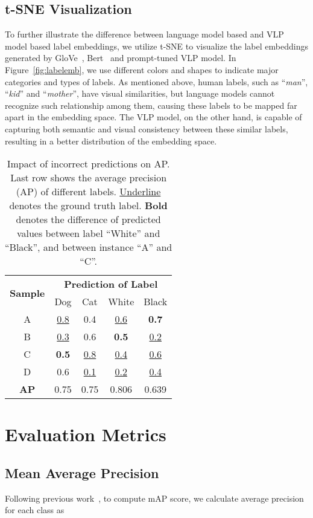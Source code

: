 \documentclass[letterpaper]{article} \usepackage{aaai23}  \usepackage{times}  \usepackage{helvet}  \usepackage{courier}  \usepackage[hyphens]{url}  \usepackage{graphicx} \urlstyle{rm} \def\UrlFont{\rm}  \usepackage{natbib}  \usepackage{caption} \frenchspacing  \setlength{\pdfpagewidth}{8.5in}  \setlength{\pdfpageheight}{11in}
\begin{document}
\subsection{t-SNE Visualization}
To further illustrate the difference between language model based and VLP model based label embeddings, we utilize t-SNE to visualize the label embeddings generated by GloVe~\cite{glove}, Bert~\cite{devlin2018bert} and prompt-tuned VLP model.
In Figure~\ref{fig:labelemb}, we use different colors and shapes to indicate major categories and types of labels.
As mentioned above, human labels, such as ``\textit{man}'', ``\textit{kid}'' and ``\textit{mother}'', have visual similarities, but language models cannot recognize such relationship among them, causing these labels to be mapped far apart in the embedding space.
The VLP model, on the other hand, is capable of capturing both semantic and visual consistency between these similar labels, resulting in a better distribution of the embedding space.

\begin{table}[t]
\footnotesize
\caption{
Impact of incorrect predictions on AP. 
Last row shows the average precision (AP) of different labels. \underline{Underline} denotes the ground truth label.  \textbf{Bold} denotes the difference of predicted values between label ``White'' and ``Black'', and between instance ``A'' and ``C''. }
\centering
\begin{tabular}{c|cccc}
\toprule[0.15em]
\multirow{2}{*}{\textbf{Sample}} & \multicolumn{4}{c}{\textbf{Prediction of Label}} \\ 
& Dog & Cat & White & Black \\ 
\toprule[0.15em]
A & \underline{0.8} & 0.4 & \underline{0.6} & \textbf{0.7} \\ 
B & \underline{0.3} & 0.6 & \textbf{0.5} & \underline{0.2} \\ 
C & \textbf{0.5} & \underline{0.8} & \underline{0.4} & \underline{0.6} \\
D & 0.6 & \underline{0.1} & \underline{0.2} & \underline{0.4} \\ 
\hline
\textbf{AP} & 0.75 & 0.75 & 0.806 & 0.639 \\ 
\toprule[0.15em]
\end{tabular}
\label{tab:wrong}
\end{table} \section{Evaluation Metrics}
\subsection{Mean Average Precision}
Following previous work~\cite{Veit_2017_CVPR}, to compute mAP score, we calculate average precision for each class  as
\end{document}
